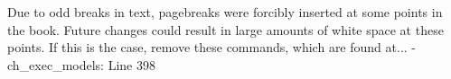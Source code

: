 Due to odd breaks in text, pagebreaks were forcibly inserted at some points in the book. Future changes could result in large amounts of white space at these points. If this is the case, remove these commands, which are found at...
- ch_exec_models: Line 398